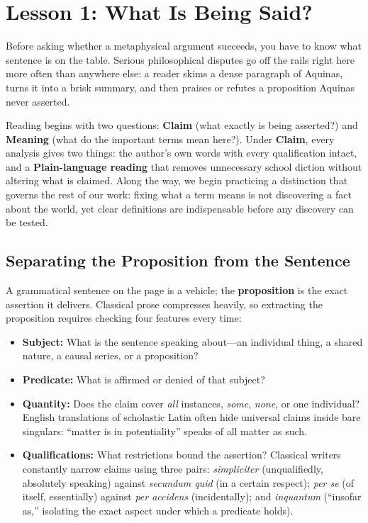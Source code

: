 \section{Lesson 1: What Is Being Said?}

Before asking whether a metaphysical argument succeeds, you have to know what sentence is on the table. Serious philosophical disputes go off the rails right here more often than anywhere else: a reader skims a dense paragraph of Aquinas, turns it into a brisk summary, and then praises or refutes a proposition Aquinas never asserted.

Reading begins with two questions: \textbf{Claim} (what exactly is being asserted?) and \textbf{Meaning} (what do the important terms mean here?). Under \textbf{Claim}, every analysis gives two things: the author's own words with every qualification intact, and a \textbf{Plain-language reading} that removes unnecessary school diction without altering what is claimed. Along the way, we begin practicing a distinction that governs the rest of our work: fixing what a term means is not discovering a fact about the world, yet clear definitions are indispensable before any discovery can be tested.

\subsection{Separating the Proposition from the Sentence}

A grammatical sentence on the page is a vehicle; the \textbf{proposition} is the exact assertion it delivers. Classical prose compresses heavily, so extracting the proposition requires checking four features every time:

\begin{itemize}
\item \textbf{Subject:} What is the sentence speaking about---an individual thing, a shared nature, a causal series, or a proposition?
\item \textbf{Predicate:} What is affirmed or denied of that subject?
\item \textbf{Quantity:} Does the claim cover \emph{all} instances, \emph{some}, \emph{none}, or one individual? English translations of scholastic Latin often hide universal claims inside bare singulars: ``matter is in potentiality'' speaks of all matter as such.
\item \textbf{Qualifications:} What restrictions bound the assertion? Classical writers constantly narrow claims using three pairs: \emph{simpliciter} (unqualifiedly, absolutely speaking) against \emph{secundum quid} (in a certain respect); \emph{per se} (of itself, essentially) against \emph{per accidens} (incidentally); and \emph{inquantum} (``insofar as,'' isolating the exact aspect under which a predicate holds).
\end{itemize}

